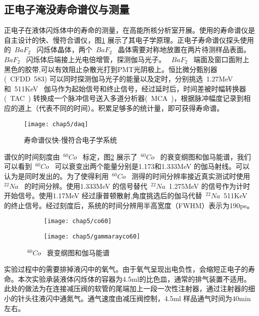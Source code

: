 \subsection{正电子淹没寿命谱仪与测量}
正电子在液体闪烁体中的寿命的测量，在高能所核分析室开展。使用的寿命谱仪是自主设计的快、慢符合谱仪，图\ref{fig:p541} 展示了其电子学原理。正电子寿命谱仪探头使用的~$BaF_{2}$~ 闪烁体晶体，两个~$BaF_{2}$~ 晶体需要对称地放置在两片待测样品表面。~$BaF_{2}$~ 闪烁体后端接上光电倍增管，探测伽马光子。%
~$BaF_{2}$~ 端面及窗口面附上黑色的胶带,可以有效阻止杂散光打到PMT光阴极上。恒比微分甄别器(~CFDD~583) 可以同时探测伽马光子的能量以及定时，分别挑选~1.27MeV~ 和~511KeV~ 伽马作为起始信号和终止信号，经过延时后，时间差被时幅转换器(~TAC~) 转换成一个脉冲信号送入多道分析器(~MCA~)，根据脉冲幅度记录到相应的道上（代表不同的时间）。积累足够多的统计量，即可获得寿命谱。
\begin{figure}[!htbp]
  \centering
  \texttt{[image: chap5/daq]}
  \caption{寿命谱仪快-慢符合电子学系统}
  \label{fig:p541}
\end{figure}
谱仪的时间刻度由~$^{60}Co$~ 标定，图\ref{fig:p54} 展示了~$^{60}Co$~ 的衰变纲图和伽马能谱，我们可以看到~$^{60}Co$~ 可以衰变出两个能量分别是1.173和1.333MeV 的伽马射线。可以认为是同时发出的。为了使得利用~$^{60}Co$~ 测得的时间分辨率接近真实测试时使用~$^{22}Na$~ 的时间分辨。使用1.333MeV 的信号替代~$^{22}Na$~1.275MeV 的信号作为计时开始信号。使用1.17MeV 经过康普顿散射,角度挑选后的伽马代替~$^{22}Na$~511KeV 的终止信号。经过刻度后，系统的时间分辨用半高宽度（FWHM）表示为190ps。
\begin{figure}[!htbp]
  \centering
  \begin{subfigure}[b]{\MySubFactor\textwidth}
    \texttt{[image: chap5/co60]}
  \end{subfigure}%
  \quad\quad\quad\quad%
  \begin{subfigure}[b]{\MySubFactor\textwidth}
    \texttt{[image: chap5/gammarayco60]}
  \end{subfigure}
  \caption{~$^{60}Co$~ 衰变纲图和伽马能谱}
  \label{fig:p54}
\end{figure}

实验过程中的需要排掉液闪中的氧气。由于氧气呈现出电负性，会缩短正电子的寿命。本次实验承装液体闪烁体的容器为4.5ml的比色皿，通常的排气装置不适用。此处的做法为在连接减压阀的软管的尾端加上一段一次性注射器，通过注射器的细小的针头往液闪中通氮气。通气速度由减压阀控制，4.5ml 样品通气时间为40min左右。

